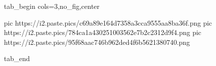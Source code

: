  
 
 
 
 


\ifcmt
  tab_begin cols=3,no_fig,center

     pic https://i2.paste.pics/c69a89e164d7358a3cca9555aa8ba36f.png
		 pic https://i2.paste.pics/784ca1a430251003562e7b2c2312d9f4.png
		 pic https://i2.paste.pics/95f68aac746b962ded4f6b5621380740.png

  tab_end
\fi

